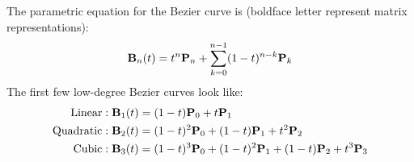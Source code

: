 \documentclass[12pt]{article}
\begin{document}
The parametric equation for the Bezier curve is (boldface letter represent matrix representations):
\[ {\bf B}_n(t) = t^n{\bf P}_n + \sum_{k = 0}^{n-1}(1-t)^{n-k}{\bf P}_k \]
The first few low-degree Bezier curves look like:
\[
\begin{aligned}
  \text{Linear}&: {\bf B}_1(t) = (1-t){\bf P}_0 + t{\bf P}_1 \\
  \text{Quadratic}&: {\bf B}_2(t) = (1-t)^2{\bf P}_0 + (1-t){\bf P}_1 + t^2{\bf P}_2 \\
  \text{Cubic}&: {\bf B}_3(t) = (1-t)^3{\bf P}_0 + (1-t)^2{\bf P}_1 + (1-t){\bf P}_2 + t^3{\bf P}_3
\end{aligned}
\]
\end{document}
